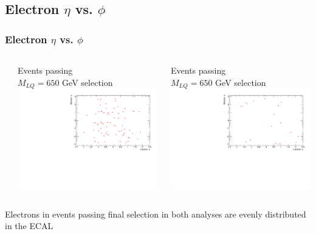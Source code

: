 \documentclass[bigger]{beamer}
\begin{document}
\subsection{Electron $\eta$ vs. $\phi$}
\label{sec-1-8}
\begin{frame}
\frametitle{Electron $\eta$ vs. $\phi$}
\label{sec-1-8-1}
\begin{columns} %
\label{sec-1-8-1-1}
\begin{column}{0.5\textwidth}
\label{sec-1-8-1-1-1}

\centering
Events passing \eejj \\
$M_{LQ} = 650$ GeV selection
\includegraphics[width=\textwidth]{fig/ee/extra/eejj_electron_map.pdf}
\end{column}
\begin{column}{0.5\textwidth}
\label{sec-1-8-1-1-2}

\centering
Events passing \enujj \\
$M_{LQ} = 650$ GeV selection
\includegraphics[width=\textwidth]{fig/enu/extra/enujj_electron_map.pdf}
\end{column}
\end{columns}
\label{sec-1-8-1-2}

\small
\centering
Electrons in events passing final selection in both analyses are evenly distributed in the ECAL
\normalsize
\end{frame}
\end{document}
